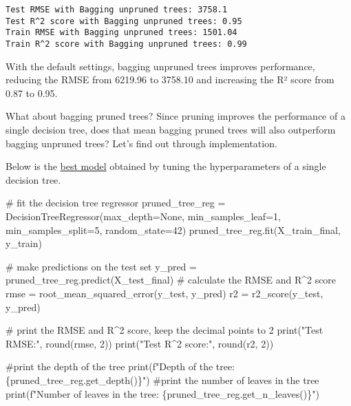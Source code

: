 \documentclass[
  letterpaper,
  DIV=11,
  numbers=noendperiod]{scrreprt}
\newenvironment{Shaded}{\begin{snugshade}}{\end{snugshade}}
\newcommand{\BuiltInTok}[1]{\textcolor[rgb]{0.00,0.23,0.31}{#1}}
\newcommand{\CommentTok}[1]{\textcolor[rgb]{0.37,0.37,0.37}{#1}}
\newcommand{\DecValTok}[1]{\textcolor[rgb]{0.68,0.00,0.00}{#1}}
\newcommand{\NormalTok}[1]{\textcolor[rgb]{0.00,0.23,0.31}{#1}}
\newcommand{\OperatorTok}[1]{\textcolor[rgb]{0.37,0.37,0.37}{#1}}
\newcommand{\SpecialCharTok}[1]{\textcolor[rgb]{0.37,0.37,0.37}{#1}}
\newcommand{\SpecialStringTok}[1]{\textcolor[rgb]{0.13,0.47,0.30}{#1}}
\newcommand{\StringTok}[1]{\textcolor[rgb]{0.13,0.47,0.30}{#1}}
\newcommand{\VariableTok}[1]{\textcolor[rgb]{0.07,0.07,0.07}{#1}}
\begin{document}
\begin{verbatim}
Test RMSE with Bagging unpruned trees: 3758.1
Test R^2 score with Bagging unpruned trees: 0.95
Train RMSE with Bagging unpruned trees: 1501.04
Train R^2 score with Bagging unpruned trees: 0.99
\end{verbatim}

With the default settings, bagging unpruned trees improves performance,
reducing the RMSE from 6219.96 to 3758.10 and increasing the R² score
from 0.87 to 0.95.

What about bagging pruned trees? Since pruning improves the performance
of a single decision tree, does that mean bagging pruned trees will also
outperform bagging unpruned trees? Let's find out through
implementation.

Below is the
\href{https://lizhen0909.github.io/STAT303-3-class-notes/regression_tree_sp25.html\#key-hyperparameters-in-decision-tree}{best
model} obtained by tuning the hyperparameters of a single decision tree.

\begin{Shaded}
\begin{Highlighting}[]
\CommentTok{\# fit the decision tree regressor}
\NormalTok{pruned\_tree\_reg }\OperatorTok{=}\NormalTok{ DecisionTreeRegressor(max\_depth}\OperatorTok{=}\VariableTok{None}\NormalTok{, min\_samples\_leaf}\OperatorTok{=}\DecValTok{1}\NormalTok{, min\_samples\_split}\OperatorTok{=}\DecValTok{5}\NormalTok{, random\_state}\OperatorTok{=}\DecValTok{42}\NormalTok{)}
\NormalTok{pruned\_tree\_reg.fit(X\_train\_final, y\_train)}

\CommentTok{\# make predictions on the test set}
\NormalTok{y\_pred }\OperatorTok{=}\NormalTok{ pruned\_tree\_reg.predict(X\_test\_final)}
\CommentTok{\# calculate the RMSE and R\^{}2 score}
\NormalTok{rmse }\OperatorTok{=}\NormalTok{ root\_mean\_squared\_error(y\_test, y\_pred)}
\NormalTok{r2 }\OperatorTok{=}\NormalTok{ r2\_score(y\_test, y\_pred)}

\CommentTok{\# print the RMSE and R\^{}2 score, keep the decimal points to 2}
\BuiltInTok{print}\NormalTok{(}\StringTok{"Test RMSE:"}\NormalTok{, }\BuiltInTok{round}\NormalTok{(rmse, }\DecValTok{2}\NormalTok{))}
\BuiltInTok{print}\NormalTok{(}\StringTok{"Test R\^{}2 score:"}\NormalTok{, }\BuiltInTok{round}\NormalTok{(r2, }\DecValTok{2}\NormalTok{))}

\CommentTok{\#print the depth of the tree}
\BuiltInTok{print}\NormalTok{(}\SpecialStringTok{f"Depth of the tree: }\SpecialCharTok{\{}\NormalTok{pruned\_tree\_reg}\SpecialCharTok{.}\NormalTok{get\_depth()}\SpecialCharTok{\}}\SpecialStringTok{"}\NormalTok{)}
\CommentTok{\#print the number of leaves in the tree}
\BuiltInTok{print}\NormalTok{(}\SpecialStringTok{f"Number of leaves in the tree: }\SpecialCharTok{\{}\NormalTok{pruned\_tree\_reg}\SpecialCharTok{.}\NormalTok{get\_n\_leaves()}\SpecialCharTok{\}}\SpecialStringTok{"}\NormalTok{)}
\end{Highlighting}
\end{Shaded}
\end{document}
